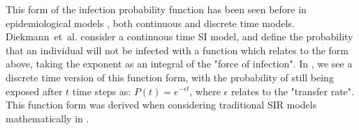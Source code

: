 \documentclass[10pt]{article}
\theoremstyle{definition}
\begin{document}
This form of the infection probability function has been seen before in
epidemiological models
\cite{diekmann2000mathematical,hethcote1989periodicity,hethcote1994thousand},
both continuous and discrete time models. Diekmann~et~al.
\cite{diekmann2000mathematical} 
consider a continuous time SI model, and define the probability that an
individual will not be infected with a function which relates to the form
above, taking the exponent as an integral of the "force of infection". 
In \cite{hethcote1994thousand}, we see a discrete time version of this
function form, with the probability of still being exposed after $t$ time
steps as: $P(t) = e^{-\epsilon t}$, where $\epsilon$ relates to the
"transfer rate". This function form was derived when considering
traditional SIR models mathematically in \cite{hethcote1989periodicity}.
\end{document}
